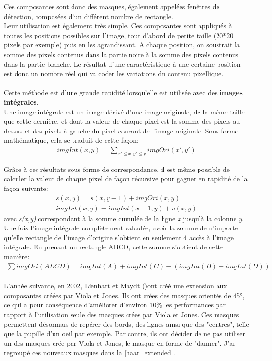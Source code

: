 \documentclass[overfullbox, poster]{polytech/polytech}
\begin{document}
Ces composantes sont donc des masques, également appelées fenêtres de détection, composées d'un différent nombre de rectangle.\\
Leur utilisation est également très simple. Ces composantes sont appliqués à toutes les positions possibles sur l'image, tout d'abord de petite taille (20*20 pixels par exemple) puis en les agrandissant. A chaque position, on soustrait la somme des pixels contenus dans la partie noire à la somme des pixels contenus dans la partie blanche. Le résultat d'une caractéristique à une certaine position est donc un nombre réel qui va coder les variations du contenu pixellique.\\
\\
Cette méthode est d'une grande rapidité lorsqu'elle est utilisée avec des \textbf{images intégrales}.\\
Une image intégrale est un image dérivé d'une image originale, de la même taille que cette dernière, et dont la valeur de chaque pixel est la somme des pixels au-dessus et des pixels à gauche du pixel courant de l'image originale. Sous forme mathématique, cela se traduit de cette façon:
\begin{align*}
imgInt(x,y)= \sum \nolimits_{x' \leq x , y' \leq y} imgOri(x',y')
\end{align*}

Grâce à ces résultats sous forme de correspondance, il est même possible de calculer la valeur de chaque pixel de façon récursive pour gagner en rapidité de la façon suivante:
\begin{align*}
s(x,y)=s(x,y-1)+imgOri(x,y)\\
imgInt(x,y)=imgInt(x-1,y)+s(x,y)
\end{align*}
avec \textit{s(x,y)} correspondant à la somme cumulée de la ligne \textit{x} jusqu'à la colonne \textit{y}. \\
Une fois l'image intégrale complètement calculée, avoir la somme de n'importe qu'elle rectangle de l'image d'origine s'obtient en seulement 4 accès à l'image intégrale. En prenant un rectangle ABCD, cette somme s'obtient de cette manière:
\begin{align*}
\sum imgOri(ABCD) = imgInt(A) + imgInt(C) - (imgInt(B) + imgInt(D))
\end{align*}
\\
L'année suivante, en 2002, Lienhart et Maydt (\cite{extended_haar})ont créé une extension aux composantes créées par Viola et Jones. Ils ont crées des masques orientés de 45°, ce qui a pour conséquence d'améliorer d'environ 10\% les performances par rapport à l'utilisation seule des masques crées par Viola et Jones. Ces masques permettent désormais de repérer des bords, des lignes ainsi que des "centres", telle que la pupille d'un oeil par exemple. Par contre, ils ont décider de ne pas utiliser un des masques crée par Viola et Jones, le masque en forme de "damier". J'ai regroupé ces nouveaux masques dans la \autoref{haar_extended}.
\end{document}
